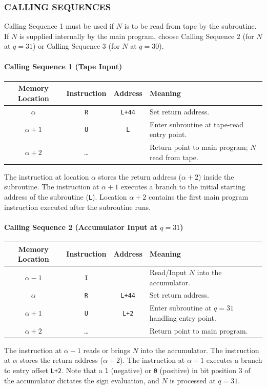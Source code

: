 \subsubsection*{CALLING SEQUENCES}
Calling Sequence 1 must be used if $N$ is to be read from tape by the subroutine. If $N$ is supplied internally by the main program, choose Calling Sequence 2 (for $N$ at $q=31$) or Calling Sequence 3 (for $N$ at $q=30$).

\paragraph{Calling Sequence 1 (Tape Input)}
\begin{table}[h!]
\centering
\begin{tabularx}{\textwidth}{cccX}
\toprule
\textbf{Memory Location} & \textbf{Instruction} & \textbf{Address} & \textbf{Meaning} \\
\midrule
$\alpha$     & \texttt{R} & \texttt{L+44} & Set return address. \\
$\alpha+1$   & \texttt{U} & \texttt{L}    & Enter subroutine at tape-read entry point. \\
$\alpha+2$   & \dots      &                & Return point to main program; $N$ read from tape. \\
\bottomrule
\end{tabularx}
\end{table}
The instruction at location $\alpha$ stores the return address ($\alpha+2$) inside the subroutine. The instruction at $\alpha+1$ executes a branch to the initial starting address of the subroutine (\texttt{L}). Location $\alpha+2$ contains the first main program instruction executed after the subroutine runs.

\paragraph{Calling Sequence 2 (Accumulator Input at $q=31$)}
\begin{table}[h!]
\centering
\begin{tabularx}{\textwidth}{cccX}
\toprule
\textbf{Memory Location} & \textbf{Instruction} & \textbf{Address} & \textbf{Meaning} \\
\midrule
$\alpha-1$   & \texttt{I} &                  & Read/Input $N$ into the accumulator. \\
$\alpha$     & \texttt{R} & \texttt{L+44}    & Set return address. \\
$\alpha+1$   & \texttt{U} & \texttt{L+2}     & Enter subroutine at $q=31$ handling entry point. \\
$\alpha+2$   & \dots      &                  & Return point to main program. \\
\bottomrule
\end{tabularx}
\end{table}
The instruction at $\alpha-1$ reads or brings $N$ into the accumulator. The instruction at $\alpha$ stores the return address ($\alpha+2$). The instruction at $\alpha+1$ executes a branch to entry offset \texttt{L+2}. Note that a \texttt{1} (negative) or \texttt{0} (positive) in bit position 3 of the accumulator dictates the sign evaluation, and $N$ is processed at $q=31$.

